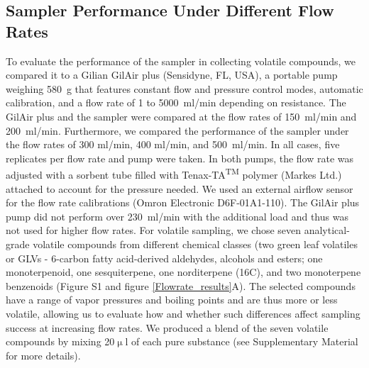 \subsection{Sampler Performance Under Different Flow Rates}
%
To evaluate the performance of the sampler in collecting volatile compounds, we compared it to a Gilian GilAir plus (Sensidyne, FL, USA), a  portable pump weighing 580~g that features constant flow and pressure control modes, automatic calibration, and a flow rate of 1 to 5000~ml/min depending on resistance. The GilAir plus and the sampler were compared at the flow rates of 150~ml/min and 200~ml/min. Furthermore, we compared the performance of the sampler under the flow rates of 300 ml/min, 400 ml/min, and 500~ml/min. In all cases, five replicates per flow rate and pump were taken. In both pumps, the flow rate was adjusted with a sorbent tube filled with Tenax-TA\textsuperscript{TM} polymer (Markes Ltd.) attached to account for the pressure needed. We used an external airflow sensor for the flow rate calibrations (Omron Electronic D6F-01A1-110). The GilAir plus pump did not perform over 230~ml/min with the additional load and thus was not used for higher flow rates.
For volatile sampling, we chose seven analytical-grade volatile compounds from different chemical classes (two green leaf volatiles or GLVs - 6-carbon fatty acid-derived aldehydes, alcohols and esters; one monoterpenoid, one sesquiterpene, one norditerpene (16C), and two monoterpene benzenoids (Figure S1 and figure \ref{Flowrate_results}A). The selected compounds have a range of vapor pressures and boiling points and are thus more or less volatile, allowing us to evaluate how and whether such differences affect sampling success at increasing flow rates. We produced a blend of the seven volatile compounds by mixing 20$\upmu$l of each pure substance (see Supplementary Material for more details).  




